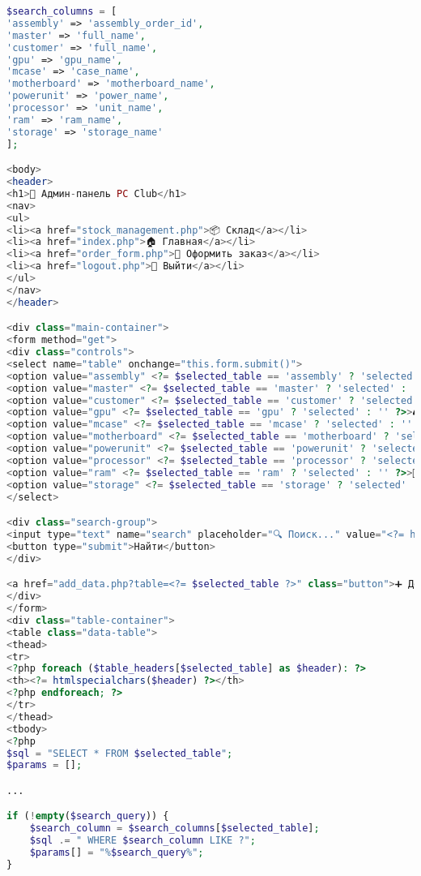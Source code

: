\begin{lstlisting}[language=Php, frame=none]
$search_columns = [
'assembly' => 'assembly_order_id',
'master' => 'full_name',
'customer' => 'full_name',
'gpu' => 'gpu_name',
'mcase' => 'case_name',
'motherboard' => 'motherboard_name',
'powerunit' => 'power_name',
'processor' => 'unit_name',
'ram' => 'ram_name',
'storage' => 'storage_name'
];

<body>
<header>
<h1>🔧 Админ-панель PC Club</h1>
<nav>
<ul>
<li><a href="stock_management.php">📦 Склад</a></li>
<li><a href="index.php">🏠 Главная</a></li>
<li><a href="order_form.php">🛒 Оформить заказ</a></li>
<li><a href="logout.php">🚪 Выйти</a></li>
</ul>
</nav>
</header>

<div class="main-container">
<form method="get">
<div class="controls">
<select name="table" onchange="this.form.submit()">
<option value="assembly" <?= $selected_table == 'assembly' ? 'selected' : '' ?>>🎁 Сборки</option>
<option value="master" <?= $selected_table == 'master' ? 'selected' : '' ?>>👨💼 Мастера</option>
<option value="customer" <?= $selected_table == 'customer' ? 'selected' : '' ?>>👥 Клиенты</option>
<option value="gpu" <?= $selected_table == 'gpu' ? 'selected' : '' ?>>🎮 Видеокарты</option>
<option value="mcase" <?= $selected_table == 'mcase' ? 'selected' : '' ?>>🖥️ Корпуса</option>
<option value="motherboard" <?= $selected_table == 'motherboard' ? 'selected' : '' ?>>🔌 Материнки</option>
<option value="powerunit" <?= $selected_table == 'powerunit' ? 'selected' : '' ?>>🔋 Блоки питания</option>
<option value="processor" <?= $selected_table == 'processor' ? 'selected' : '' ?>>⚡ Процессоры</option>
<option value="ram" <?= $selected_table == 'ram' ? 'selected' : '' ?>>💾 ОЗУ</option>
<option value="storage" <?= $selected_table == 'storage' ? 'selected' : '' ?>>💽 Накопители</option>
</select>

<div class="search-group">
<input type="text" name="search" placeholder="🔍 Поиск..." value="<?= htmlspecialchars($search_query) ?>">
<button type="submit">Найти</button>
</div>

<a href="add_data.php?table=<?= $selected_table ?>" class="button">➕ Добавить запись</a>
</div>
</form>
<div class="table-container">
<table class="data-table">
<thead>
<tr>
<?php foreach ($table_headers[$selected_table] as $header): ?>
<th><?= htmlspecialchars($header) ?></th>
<?php endforeach; ?>
</tr>
</thead>
<tbody>
<?php
$sql = "SELECT * FROM $selected_table";
$params = [];

...

if (!empty($search_query)) {
	$search_column = $search_columns[$selected_table];
	$sql .= " WHERE $search_column LIKE ?";
	$params[] = "%$search_query%";
}


\end{lstlisting}
